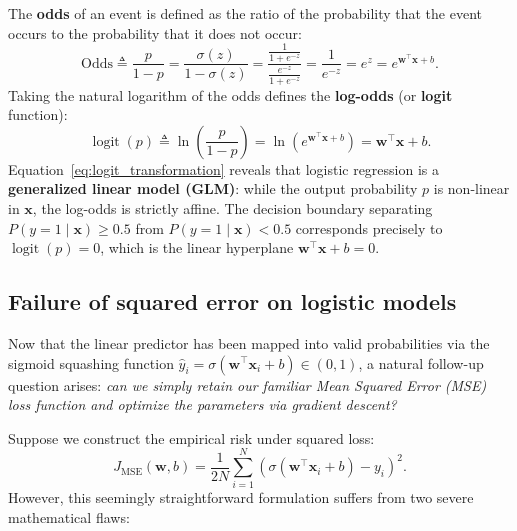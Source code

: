 The \textbf{odds} of an event is defined as the ratio of the probability that the event occurs to the probability that it does not occur:
\begin{equation}
\text{Odds} \triangleq \frac{p}{1 - p} = \frac{\sigma(z)}{1 - \sigma(z)} = \frac{\frac{1}{1 + e^{-z}}}{\frac{e^{-z}}{1 + e^{-z}}} = \frac{1}{e^{-z}} = e^z = e^{\mathbf{w}^\top \mathbf{x} + b}.
\label{eq:odds_ratio}
\end{equation}
Taking the natural logarithm of the odds defines the \textbf{log-odds} (or \textbf{logit} function):
\begin{equation}
\operatorname{logit}(p) \triangleq \ln\left( \frac{p}{1 - p} \right) = \ln\left( e^{\mathbf{w}^\top \mathbf{x} + b} \right) = \mathbf{w}^\top \mathbf{x} + b.
\label{eq:logit_transformation}
\end{equation}
Equation~\eqref{eq:logit_transformation} reveals that logistic regression is a \textbf{generalized linear model (GLM)}: while the output probability $p$ is non-linear in $\mathbf{x}$, the log-odds is strictly affine. The decision boundary separating $P(y=1 \mid \mathbf{x}) \ge 0.5$ from $P(y=1 \mid \mathbf{x}) < 0.5$ corresponds precisely to $\operatorname{logit}(p) = 0$, which is the linear hyperplane $\mathbf{w}^\top \mathbf{x} + b = 0$.

\subsection{Failure of squared error on logistic models}
\label{sec:squared_error_sigmoid_failure}

Now that the linear predictor has been mapped into valid probabilities via the sigmoid squashing function $\hat{y}_i = \sigma(\mathbf{w}^\top \mathbf{x}_i + b) \in (0, 1)$, a natural follow-up question arises: \textit{can we simply retain our familiar Mean Squared Error (MSE) loss function and optimize the parameters via gradient descent?}

Suppose we construct the empirical risk under squared loss:
\begin{equation}
J_{\text{MSE}}(\mathbf{w}, b) = \frac{1}{2N} \sum_{i=1}^N \left( \sigma(\mathbf{w}^\top \mathbf{x}_i + b) - y_i \right)^2.
\label{eq:mse_sigmoid_objective}
\end{equation}
However, this seemingly straightforward formulation suffers from two severe mathematical flaws:

